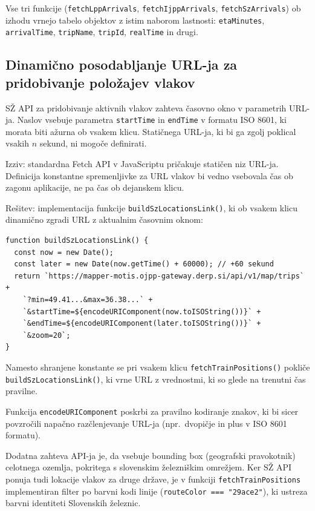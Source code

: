 \documentclass[12pt]{article}
\begin{document}
Vse tri funkcije (\texttt{fetchLppArrivals}, \texttt{fetchIjppArrivals}, \texttt{fetchSzArrivals}) ob izhodu vrnejo tabelo objektov z istim naborom lastnosti: \texttt{etaMinutes}, \texttt{arrivalTime}, \texttt{tripName}, \texttt{tripId}, \texttt{realTime} in drugi.

\subsection{Dinamično posodabljanje URL-ja za pridobivanje položajev vlakov}

SŽ API za pridobivanje aktivnih vlakov zahteva časovno okno v parametrih URL-ja. Naslov vsebuje parametra \texttt{startTime} in \texttt{endTime} v formatu ISO 8601, ki morata biti ažurna ob vsakem klicu. Statičnega URL-ja, ki bi ga zgolj poklical vsakih $n$ sekund, ni mogoče definirati.

Izziv: standardna Fetch API v JavaScriptu pričakuje statičen niz URL-ja. Definicija konstantne spremenljivke za URL vlakov bi vedno vsebovala čas ob zagonu aplikacije, ne pa čas ob dejanskem klicu.

Rešitev: implementacija funkcije \texttt{buildSzLocationsLink()}, ki ob vsakem klicu dinamično zgradi URL z aktualnim časovnim oknom:

\begin{lstlisting}[caption={Dinamična gradnja URL-ja za SŽ API}, label={lst:dynurl}]
function buildSzLocationsLink() {
  const now = new Date();
  const later = new Date(now.getTime() + 60000); // +60 sekund
  return `https://mapper-motis.ojpp-gateway.derp.si/api/v1/map/trips` +
    `?min=49.41...&max=36.38...` +
    `&startTime=${encodeURIComponent(now.toISOString())}` +
    `&endTime=${encodeURIComponent(later.toISOString())}` +
    `&zoom=20`;
}
\end{lstlisting}

Namesto shranjene konstante se pri vsakem klicu \texttt{fetchTrainPositions()} pokliče \texttt{buildSzLocationsLink()}, ki vrne URL z vrednostmi, ki so glede na trenutni čas pravilne.

Funkcija \texttt{encodeURIComponent} poskrbi za pravilno kodiranje znakov, ki bi sicer povzročili napačno razčlenjevanje URL-ja (npr.\ dvopičje in plus v ISO 8601 formatu).

Dodatna zahteva API-ja je, da vsebuje bounding box (geografski pravokotnik) celotnega ozemlja, pokritega s slovenskim železniškim omrežjem. Ker SŽ API ponuja tudi lokacije vlakov za druge države, je v funkciji \texttt{fetchTrainPositions} implementiran filter po barvni kodi linije (\texttt{routeColor === "29ace2"}), ki ustreza barvni identiteti Slovenskih železnic.
\end{document}
